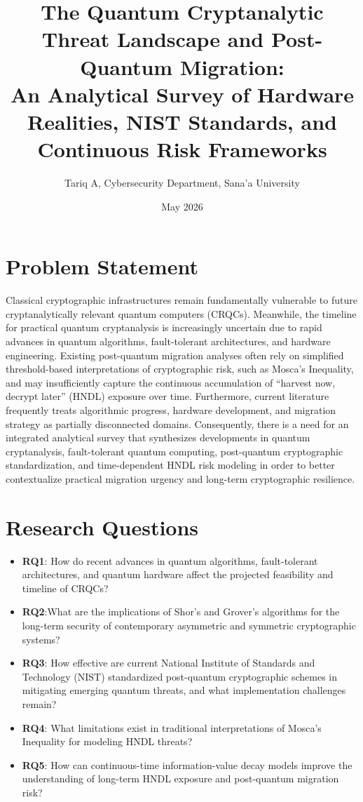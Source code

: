 \documentclass[11pt,a4paper]{article}
\title{\textbf{The Quantum Cryptanalytic Threat Landscape and Post-Quantum Migration:\\An Analytical Survey of Hardware Realities, NIST Standards, and Continuous Risk Frameworks}}
\author{Tariq A, Cybersecurity Department, Sana’a University}
\date{May 2026}
\begin{document}
\maketitle
\section{Problem Statement}
Classical cryptographic infrastructures remain fundamentally vulnerable to future cryptanalytically relevant quantum computers (CRQCs). Meanwhile, the timeline for practical quantum cryptanalysis is increasingly uncertain due to rapid advances in quantum algorithms, fault-tolerant architectures, and hardware engineering. Existing post-quantum migration analyses often rely on simplified threshold-based interpretations of cryptographic risk, such as Mosca’s Inequality, and may insufficiently capture the continuous accumulation of “harvest now, decrypt later” (HNDL) exposure over time. Furthermore, current literature frequently treats algorithmic progress, hardware development, and migration strategy as partially disconnected domains. Consequently, there is a need for an integrated analytical survey that synthesizes developments in quantum cryptanalysis, fault-tolerant quantum computing, post-quantum cryptographic standardization, and time-dependent HNDL risk modeling in order to better contextualize practical migration urgency and long-term cryptographic resilience.

\section{Research Questions}
\begin{itemize}[leftmargin=*]

  \item \textbf{RQ1}: How do recent advances in quantum algorithms, fault-tolerant architectures, and quantum hardware affect the projected feasibility and timeline of CRQCs?
  \item \textbf{RQ2}:What are the implications of Shor’s and Grover’s algorithms for the long-term security of contemporary asymmetric and symmetric cryptographic systems?
  \item \textbf{RQ3}: How effective are current National Institute of Standards and Technology (NIST) standardized post-quantum cryptographic schemes in mitigating emerging quantum threats, and what implementation challenges remain?
  \item \textbf{RQ4}: What limitations exist in traditional interpretations of Mosca’s Inequality for modeling HNDL threats?
  \item \textbf{RQ5}: How can continuous-time information-value decay models improve the understanding of long-term HNDL exposure and post-quantum migration risk?
\end{itemize}  
\end{document}

